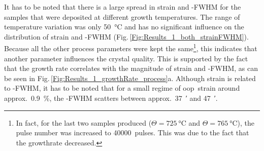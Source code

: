 It has to be noted that there is a large spread in strain and \textomega-FWHM for the samples that were deposited at different growth temperatures.
The range of temperature variation was only \qty{50}{\degreeCelsius} and has no significant influence on the distribution of strain and \textomega-FWHM (Fig.\,\ref{Fig:Results_1_both_strainFWHM}).
Because all the other process parameters were kept the same\footnote{
    In fact, for the last two samples produced ($\Theta=\qty{725}{\degreeCelsius}$ and $\Theta=\qty{765}{\degreeCelsius}$), the pulse number was increased to \qty{40000}{pulses}.
    This was due to the fact that the growthrate decreased.
},
this indicates that another parameter influences the crystal quality.
This is supported by the fact that the growth rate correlates with the magnitude of strain and \textomega-FWHM, as can be seen in Fig.\,\ref{Fig:Results_1_growthRate_process}a.
Although strain is related to \textomega-FWHM, it has to be noted that for a small regime of \gls{oop}\ strain around approx.\ \qty{0.9}{\percent}, the \textomega-FWHM scatters between approx.\ \qty{37}{\arcminute} and \qty{47}{\arcminute}.

